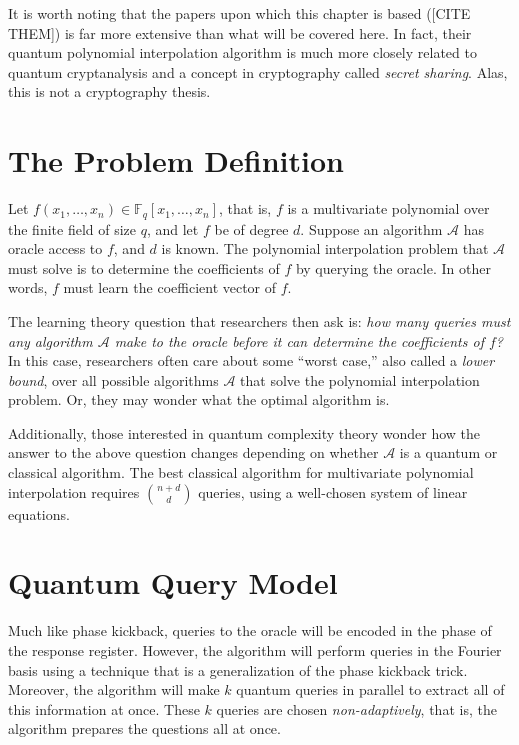 \documentclass[12pt,twoside]{reedthesis}
\theoremstyle{definition}
\newcommand{\F}{\mathbb{F}}
\begin{document}
It is worth noting that the papers upon which this chapter is based ([CITE THEM]) is far more extensive than what will be covered here. In fact, their quantum polynomial interpolation algorithm is much more closely related to quantum cryptanalysis and a concept in cryptography called \textit{secret sharing}. Alas, this is not a cryptography thesis.

\section{The Problem Definition}
Let $f(x_1, \ldots, x_n)\in \F_q[x_1, \ldots, x_n]$, that is, $f$ is a multivariate polynomial over the finite field of size $q$, and let $f$ be of degree $d$. Suppose an algorithm $\mathcal{A}$ has oracle access to $f$, and $d$ is known. The polynomial interpolation problem that $\mathcal{A}$ must solve is to determine the coefficients of $f$ by querying the oracle. In other words, $f$ must learn the coefficient vector of $f$.

The learning theory question that researchers then ask is: \textit{how many queries must any algorithm $\mathcal{A}$ make to the oracle before it can determine the coefficients of $f$?} In this case, researchers often care about some ``worst case,'' also called a \textit{lower bound}, over all possible algorithms $\mathcal{A}$ that solve the polynomial interpolation problem. Or, they may wonder what the optimal algorithm is. 

Additionally, those interested in quantum complexity theory wonder how the answer to the above question changes depending on whether $\mathcal{A}$ is a quantum or classical algorithm. The best classical algorithm for multivariate polynomial interpolation requires ${n+d \choose d}$ queries, using a well-chosen system of linear equations.

\section{Quantum Query Model}
Much like phase kickback, queries to the oracle will be encoded in the phase of the response register. However, the algorithm will perform queries in the Fourier basis using a technique that is a generalization of the phase kickback trick. Moreover, the algorithm will make $k$ quantum queries in parallel to extract all of this information at once. These $k$ queries are chosen \textit{non-adaptively}, that is, the algorithm prepares the questions all at once.
\end{document}

